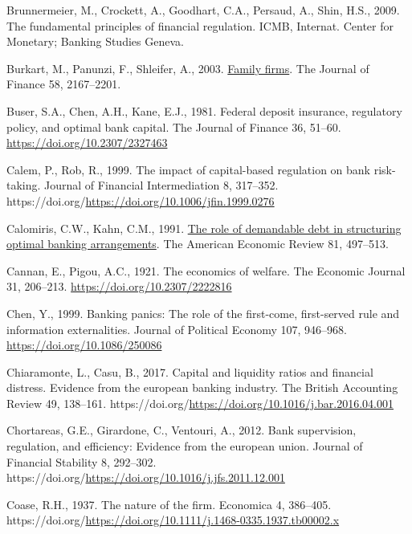 \documentclass[
  12pt,
  a4paper,
  DIV=11,
  numbers=noendperiod]{scrreprt}
\newlength{\cslhangindent}
\newenvironment{CSLReferences}[2] %
 {\begin{list}{}{%
  \setlength{\itemindent}{0pt}
  \setlength{\leftmargin}{0pt}
  \setlength{\parsep}{0pt}
  \ifodd #1
   \setlength{\leftmargin}{\cslhangindent}
   \setlength{\itemindent}{-1\cslhangindent}
  \fi
  \setlength{\itemsep}{#2\baselineskip}}}
 {\end{list}}
\begin{document}
\begin{CSLReferences}{1}{0}
Brunnermeier, M., Crockett, A., Goodhart, C.A., Persaud, A., Shin, H.S.,
2009. The fundamental principles of financial regulation. ICMB,
Internat. Center for Monetary; Banking Studies Geneva.

Burkart, M., Panunzi, F., Shleifer, A., 2003.
\href{http://www.jstor.org/stable/3648187}{Family firms}. The Journal of
Finance 58, 2167--2201.

Buser, S.A., Chen, A.H., Kane, E.J., 1981. Federal deposit insurance,
regulatory policy, and optimal bank capital. The Journal of Finance 36,
51--60. \url{https://doi.org/10.2307/2327463}

Calem, P., Rob, R., 1999. The impact of capital-based regulation on bank
risk-taking. Journal of Financial Intermediation 8, 317--352.
https://doi.org/\url{https://doi.org/10.1006/jfin.1999.0276}

Calomiris, C.W., Kahn, C.M., 1991.
\href{http://www.jstor.org/stable/2006515}{The role of demandable debt
in structuring optimal banking arrangements}. The American Economic
Review 81, 497--513.

Cannan, E., Pigou, A.C., 1921. The economics of welfare. The Economic
Journal 31, 206--213. \url{https://doi.org/10.2307/2222816}

Chen, Y., 1999. Banking panics: The role of the first-come, first-served
rule and information externalities. Journal of Political Economy 107,
946--968. \url{https://doi.org/10.1086/250086}

Chiaramonte, L., Casu, B., 2017. Capital and liquidity ratios and
financial distress. Evidence from the european banking industry. The
British Accounting Review 49, 138--161.
https://doi.org/\url{https://doi.org/10.1016/j.bar.2016.04.001}

Chortareas, G.E., Girardone, C., Ventouri, A., 2012. Bank supervision,
regulation, and efficiency: Evidence from the european union. Journal of
Financial Stability 8, 292--302.
https://doi.org/\url{https://doi.org/10.1016/j.jfs.2011.12.001}

Coase, R.H., 1937. The nature of the firm. Economica 4, 386--405.
https://doi.org/\url{https://doi.org/10.1111/j.1468-0335.1937.tb00002.x}


\end{CSLReferences}
\end{document}
